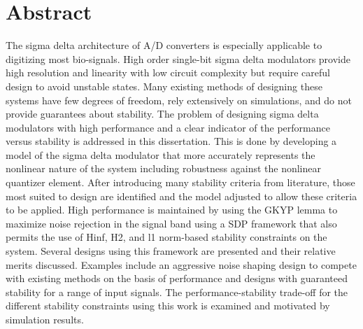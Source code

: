 
\chapter{Abstract}

The sigma delta architecture of \gls{A/D} converters is especially applicable to digitizing most bio-signals. High order single-bit sigma delta modulators provide high resolution and linearity with low circuit complexity but require careful design to avoid unstable states. Many existing methods of designing these systems have few degrees of freedom, rely extensively on simulations, and do not provide guarantees about stability. The problem of designing sigma delta modulators with high performance and a clear indicator of the performance versus stability is addressed in this dissertation. This is done by developing a model of the sigma delta modulator that more accurately represents the nonlinear nature of the system including robustness against the nonlinear quantizer element. After introducing many stability criteria from literature, those most suited to design are identified and the model adjusted to allow these criteria to be applied. High performance is maintained by using the \gls{GKYP} lemma to maximize noise rejection in the signal band using a \gls{SDP} framework that also permits the use of \gls{Hinf}, \gls{H2}, and \gls{l1} norm-based stability constraints on the system. Several designs using this framework are presented and their relative merits discussed. Examples include an aggressive noise shaping design to compete with existing methods on the basis of performance and designs with guaranteed stability for a range of input signals. The performance-stability trade-off for the different stability constraints using this work is examined and motivated by simulation results.

\vfill
\begin{center}
\begin{sf}
\end{sf}
\end{center}
